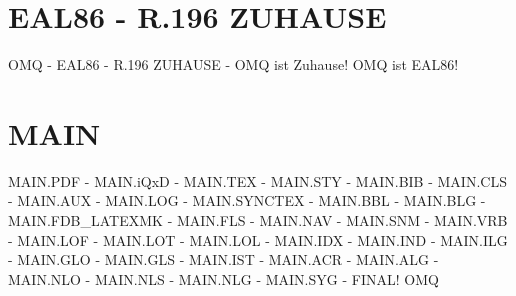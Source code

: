 \documentclass{MAIN}
\begin{document}
\maketitle
\section*{EAL86 - R.196 ZUHAUSE}
OMQ - EAL86 - R.196 ZUHAUSE - OMQ ist Zuhause! OMQ ist EAL86!
\section*{MAIN}
MAIN.PDF - MAIN.iQxD - MAIN.TEX - MAIN.STY - MAIN.BIB - MAIN.CLS - MAIN.AUX - MAIN.LOG - MAIN.SYNCTEX - MAIN.BBL - MAIN.BLG - MAIN.FDB_LATEXMK - MAIN.FLS - MAIN.NAV - MAIN.SNM - MAIN.VRB - MAIN.LOF - MAIN.LOT - MAIN.LOL - MAIN.IDX - MAIN.IND - MAIN.ILG - MAIN.GLO - MAIN.GLS - MAIN.IST - MAIN.ACR - MAIN.ALG - MAIN.NLO - MAIN.NLS - MAIN.NLG - MAIN.SYG - FINAL!
\cite{omq_eal86}
\ac{OMQ}

\printindex
\printglossary
\printnomenclature
\end{document}
